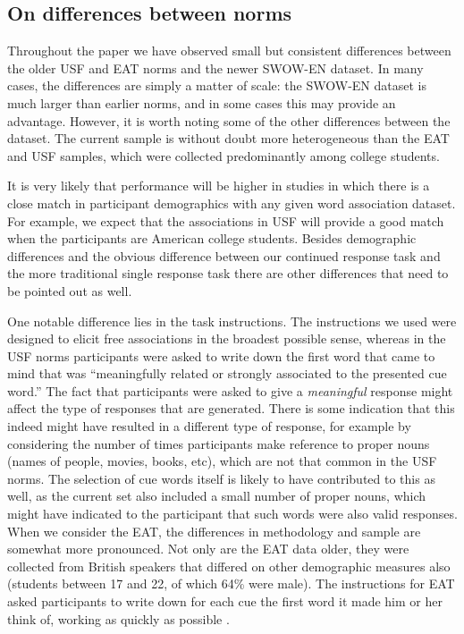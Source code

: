 \documentclass[a4paper,doc,natbib,floatsintext]{apa6}
\begin{document}
\subsection{On differences between norms}

Throughout the paper we have observed small but consistent differences between the older USF and EAT norms and the newer SWOW-EN dataset. In many cases, the differences are simply a matter of scale: the SWOW-EN dataset is much larger than earlier norms, and in some cases this may provide an advantage. However, it is worth noting some of the other differences between the dataset. The current sample is without doubt more heterogeneous than the EAT and USF samples, which were collected predominantly among college students.

It is very likely that performance will be higher in studies in which there is a close match in participant demographics with any given word association dataset. For example, we expect that the associations in USF will provide a good match when the participants are American college students. Besides demographic differences and the obvious difference between our continued response task and the more traditional single response task there are other differences that need to be pointed out as well.

One notable difference lies in the task instructions. The instructions we used were designed to elicit free associations in the broadest possible sense, whereas in the USF norms \citet{Nelson2004} participants were asked to write down the first word that came to mind that was ``meaningfully related or strongly associated to the presented cue word.'' The fact that participants were asked to give a {\it meaningful} response might affect the type of responses that are generated. There is some indication that this indeed might have resulted in a different type of response, for example by considering the number of times participants make reference to proper nouns (names of people, movies, books, etc), which are not that common in the USF norms. The selection of cue words itself is likely to have contributed to this as well, as the current set also included a small number of proper nouns, which might have indicated to the participant that such words were also valid responses. When we consider the EAT, the differences in methodology and sample are somewhat more pronounced. Not only are the EAT data older, they were collected from British speakers that differed on other demographic measures also (students between 17 and 22, of which 64\% were male). The instructions for EAT asked participants to write down for each cue the first word it made him or her think of, working as quickly as possible \citep{Kiss1973}.
\end{document}
